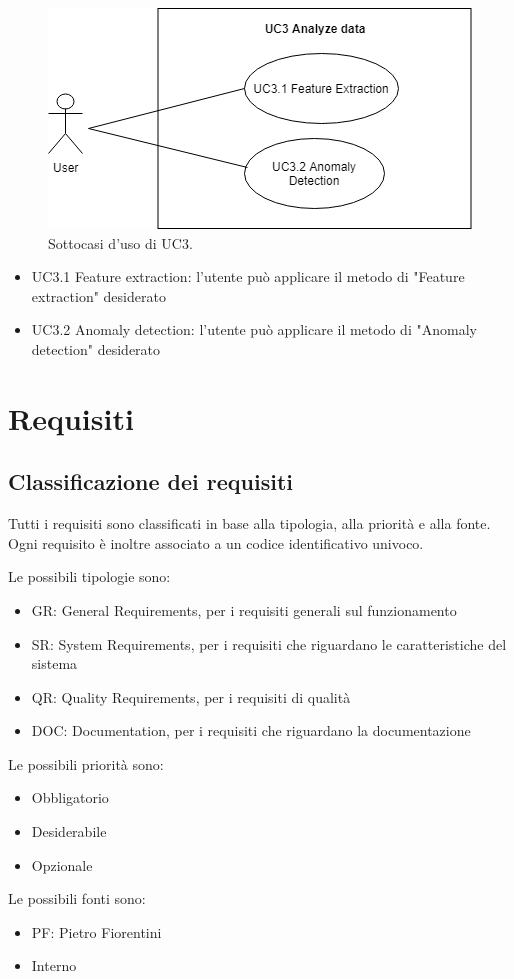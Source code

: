 \begin{figure} [H]
	\includegraphics[width=\textwidth]{figures/UC3}
	\caption[Caso d'uso UC3]{
		Sottocasi d'uso di UC3.
		\label{fig:UC3}}
\end{figure}

\begin{itemize}
	\item UC3.1 Feature extraction: l'utente può applicare il metodo di "Feature extraction" desiderato
	\item UC3.2 Anomaly detection: l'utente può applicare il metodo di "Anomaly detection" desiderato
	
\end{itemize}

\section{Requisiti}
\subsection{Classificazione dei requisiti}
Tutti i requisiti sono classificati in base alla tipologia, alla priorità e alla fonte. Ogni requisito è inoltre associato a un codice identificativo univoco.

Le possibili tipologie sono:
\begin{itemize}
	\item GR: General Requirements, per i requisiti generali sul funzionamento
	\item SR: System Requirements, per i requisiti che riguardano le caratteristiche del sistema
	\item QR: Quality Requirements, per i requisiti di qualità
	\item DOC: Documentation, per i requisiti che riguardano la documentazione
\end{itemize}
Le possibili priorità sono:
\begin{itemize}
	\item Obbligatorio
	\item Desiderabile
	\item Opzionale
\end{itemize}
Le possibili fonti sono:
\begin{itemize}
	\item PF: Pietro Fiorentini
	\item Interno
\end{itemize}


